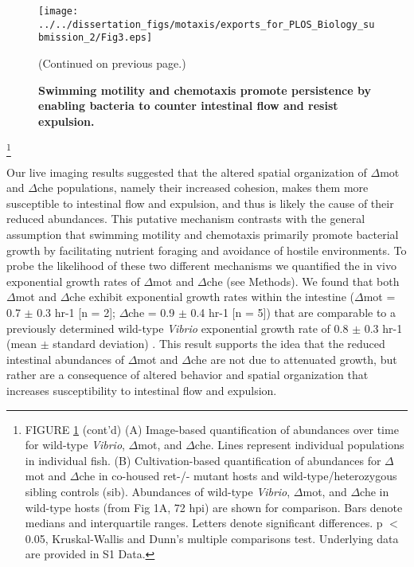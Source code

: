 {{\begin{figure}%
	\centerline{
		\texttt{[image: ../../dissertation\_figs/motaxis/exports\_for\_PLOS\_Biology\_submission\_2/Fig3.eps]}}
	\caption{\textbf{Swimming motility and chemotaxis promote persistence by enabling bacteria to counter intestinal flow and resist expulsion.}}{(Continued on previous page.)}
	\label{fig:motaxis_fig3}
\end{figure}

{\let\thefootnote\relax\footnote{FIGURE \ref{fig:motaxis_fig3} (cont'd) (A) Image-based quantification of abundances over time for wild-type \textit{Vibrio}, $\Delta$mot, and $\Delta$che. Lines represent individual populations in individual fish. (B) Cultivation-based quantification of abundances for $\Delta$mot and $\Delta$che in co-housed ret-/- mutant hosts and wild-type/heterozygous sibling controls (sib). Abundances of wild-type \textit{Vibrio}, $\Delta$mot, and $\Delta$che in wild-type hosts (from Fig 1A, 72 hpi) are shown for comparison. Bars denote medians and interquartile ranges. Letters denote significant differences. p $ < $ 0.05, Kruskal-Wallis and Dunn's multiple comparisons test. Underlying data are provided in S1 Data.}

Our live imaging results suggested that the altered spatial organization of $\Delta$mot and $\Delta$che populations, namely their increased cohesion, makes them more susceptible to intestinal flow and expulsion, and thus is likely the cause of their reduced abundances. This putative mechanism contrasts with the general assumption that swimming motility and chemotaxis primarily promote bacterial growth by facilitating nutrient foraging and avoidance of hostile environments. To probe the likelihood of these two different mechanisms we quantified the in vivo exponential growth rates of $\Delta$mot and $\Delta$che (see Methods). We found that both $\Delta$mot and $\Delta$che exhibit exponential growth rates within the intestine ($\Delta$mot = 0.7 $\pm$ 0.3 hr-1 [n = 2]; $\Delta$che = 0.9 $\pm$ 0.4 hr-1 [n = 5]) that are comparable to a previously determined wild-type \textit{Vibrio} exponential growth rate of 0.8 $\pm$ 0.3 hr-1 (mean $\pm$ standard deviation) \cite{wiles_host_2016}. This result supports the idea that the reduced intestinal abundances of $\Delta$mot and $\Delta$che are not due to attenuated growth, but rather are a consequence of altered behavior and spatial organization that increases susceptibility to intestinal flow and expulsion. 

}}}
